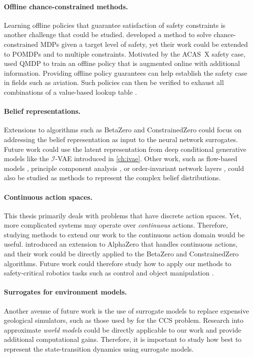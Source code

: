 \paragraph{Offline chance-constrained methods.}
Learning offline policies that guarantee satisfaction of safety constraints is another challenge that could be studied.
\textcite{ono2015chance} developed a method to solve chance-constrained MDPs given a target level of safety, yet their work could be extended to POMDPs and to multiple constraints.
Motivated by the ACAS~X safety case, \textcite{kochenderfer2012next} used QMDP \cite{littman1995learning} to train an offline policy that is augmented online with additional information.
Providing offline policy guarantees can help establish the safety case in fields such as aviation.
Such policies can then be verified to exhaust all combinations of a value-based lookup table \cite{jeannin2015formal}.

\paragraph{Belief representations.}
Extensions to algorithms such as BetaZero and ConstrainedZero could focus on addressing the belief representation as input to the neural network surrogates.
Future work could use the latent representation from deep conditional generative models like the $\mathcal{I}$-VAE introduced in \cref{ch:ivae}.
Other work, such as flow-based models \cite{chen2022flow}, principle component analysis \cite{roy2005finding}, or order-invariant network layers \cite{zaheer2017deep}, could also be studied as methods to represent the complex belief distributions.

\paragraph{Continuous action spaces.}
This thesis primarily deals with problems that have discrete action spaces.
Yet, more complicated systems may operate over \textit{continuous} actions.
Therefore, studying methods to extend our work to the continuous action domain would be useful.
\textcite{moerland2018a0c} introduced an extension to AlphaZero that handles continuous actions, and their work could be directly applied to the BetaZero and ConstrainedZero algorithms.
Future work could therefore study how to apply our methods to safety-critical robotics tasks such as control \cite{sylvie2010planning} and object manipulation \cite{pajarinen2017robotic,pajarinen2022pomdp}.

\paragraph{Surrogates for environment models.}
Another avenue of future work is the use of surrogate models to replace expensive geological simulators, such as those used by \textcite{wen2021ccsnet} for the CCS problem.
Research into approximate \textit{world models} \cite{ha2018world} could be directly applicable to our work and provide additional computational gains.
Therefore, it is important to study how best to represent the state-transition dynamics using surrogate models.
